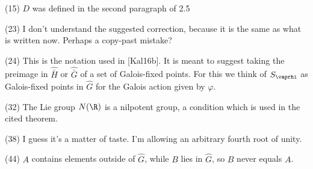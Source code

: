 (15) $D$ was defined in the second paragraph of 2.5

(23) I don't understand the suggested correction, because it is the same as what is written now. Perhaps a copy-past mistake?

(24) This is the notation used in [Kal16b]. It is meant to suggest taking the preimage in $\hat{\bar H}$ or $\hat{\bar G}$ of a set of Galois-fixed points. For this we think of $S_\vaprhi$ as Galois-fixed points in $\hat G$ for the Galois action given by $\varphi$.

(32) The Lie group $N(\R)$ is a nilpotent group, a condition which is used in the cited theorem.

(38) I guess it's a matter of taste. I'm allowing an arbitrary fourth root of unity.

(44) $A$ contains elements outside of $\hat G$, while $B$ lies in $\hat G$, so $B$ never equals $A$.